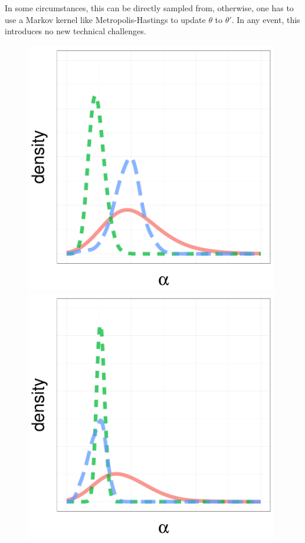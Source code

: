 In some circumstances, this can be directly sampled from, otherwise, one has to use a Markov kernel like Metropolis-Hastings to update $\theta$ to $\theta'$. 
In any event, this introduces no new technical challenges.
  \begin{figure}%
  \centering
  \begin{minipage}[hp]{0.3\linewidth}
  \centering
    \vspace{-0 in}
    \includegraphics [width=0.98\textwidth, angle=0]{figs/dist_beta.pdf}
   \vspace{0.06 in}
  \end{minipage}
  \begin{minipage}[!hp]{0.3\linewidth}
  \centering
    \includegraphics [width=0.98\textwidth, angle=0]{figs/dist_beta_100.pdf}

\end{minipage}
\end{figure}
